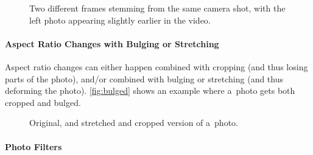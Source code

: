 \begin{figure}[h!]
  \centering
  \caption[Two different frames stemming from the same camera shot]
    {Two different frames stemming from the same camera shot,
    with the left photo appearing slightly earlier in the video.}
  \label{fig:camera-shot}  
\end{figure}

\paragraph{Aspect Ratio Changes with Bulging or Stretching}

Aspect ratio changes can either happen combined with cropping
(and thus losing parts of the photo), and/or combined with 
bulging or stretching (and thus deforming the photo).
\autoref{fig:bulged} shows an example where a~photo gets
both cropped and bulged.

\begin{figure}[h!]
  \centering
  \caption{Original, and stretched and cropped version of a~photo.}
  \label{fig:bulged}  
\end{figure}

\paragraph{Photo Filters}

